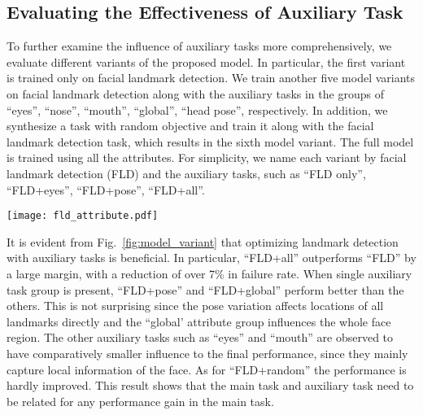 \documentclass[10pt,journal,compsoc]{IEEEtran}
\begin{document}
\subsection{Evaluating the Effectiveness of Auxiliary Task}
\label{subset:exp_related_task}
To further examine the influence of auxiliary tasks more comprehensively, we evaluate different variants of the proposed model. In particular, the first variant is trained only on facial landmark detection. We train another five model variants on facial landmark detection along with the auxiliary tasks in the groups of ``eyes'', ``nose'', ``mouth'', ``global'', ``head pose'', respectively. In addition, we synthesize a task with random objective and train it along with the facial landmark detection task, which results in the sixth model variant. The full model is trained using all the attributes. For simplicity, we name each variant by facial landmark detection (FLD) and the auxiliary tasks, such as ``FLD only'', ``FLD+eyes'', ``FLD+pose'', ``FLD+all''.

\begin{figure*}
  \centering
  \texttt{[image: fld\_attribute.pdf]}\\
  \vskip -0.3cm
  \caption{Comparison of different model variants of TCDCN: the mean error over different landmarks (left), and the overall failure rate (right).}
  \label{fig:model_variant}
  \vskip -0.5cm
\end{figure*}


It is evident from Fig.~\ref{fig:model_variant} that optimizing landmark detection with auxiliary tasks is beneficial.
In particular, ``FLD+all'' outperforms ``FLD'' by a large margin, with a reduction of over 7\% in failure rate.
When single auxiliary task group is present, ``FLD+pose'' and ``FLD+global'' perform better than the others.
This is not surprising since the pose variation affects locations of all landmarks directly and the ``global' attribute group influences the whole face region.
The other auxiliary tasks such as ``eyes'' and ``mouth'' are observed to have comparatively smaller influence to the final performance, since they mainly capture local information of the face.
As for ``FLD+random'' the performance is hardly improved. This result shows that the main task and auxiliary task need to be related for any performance gain in the main task.
\end{document}
